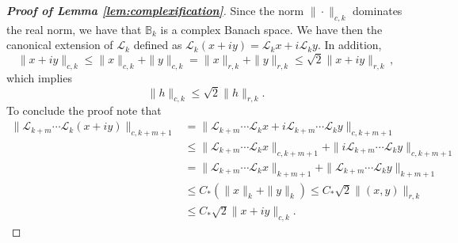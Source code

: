 \documentclass{amsart}
\numberwithin{equation}{section}
\newcommand\cL{{\mathcal L}}
\newcommand\bB{{\mathbb B}}
\begin{document}
\begin{proof}[\bf \em Proof of Lemma \ref{lem:complexification}]
Since the norm $\|\cdot\|_{c,k}$ dominates the real norm, we have that $\bB_k$ is a complex Banach space. We have then the canonical extension of $\cL_k$ defined as $\cL_k(x+iy)=\cL_k x+i\cL_k y$.
In addition,
\[
\| x + iy \|_{c,k} \le \| x \|_{c, k} + \| y \|_{c,k} = \| x \|_{r, k} + \| y \|_{r, k} \le \sqrt{2} \| x + iy \|_{r,k} \, ,
\]
which implies
\begin{equation}\label{eq:norms_equiv}
\|h\|_{c,k}\leq \sqrt 2\|h\|_{r,k}.
\end{equation}
To conclude the proof note that
\[
\begin{split}
\|\cL_{k+m}\cdots\cL_k(x+iy)\|_{c,k+m+1}&=\|\cL_{k+m}\cdots\cL_k x+i\cL_{k+m}\cdots\cL_k y\|_{c,k+m+1}\\
&\leq \|\cL_{k+m}\cdots\cL_k x\|_{c,k+m+1}+\|i\cL_{k+m}\cdots\cL_k y\|_{c,k+m+1}\\
&=\|\cL_{k+m}\cdots\cL_k x\|_{k+m+1}+ \|\cL_{k+m}\cdots\cL_k y\|_{k+m+1}\\
&\leq C_*(\|x\|_k+\|y\|_k)\leq C_*\sqrt 2\|(x,y)\|_{r,k}\\
&\leq C_*\sqrt 2\|x+iy\|_{c,k}.
\end{split}
\]
\end{proof}
\end{document}
